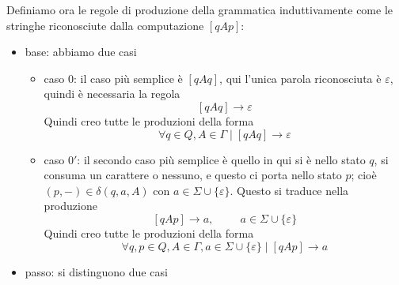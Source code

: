 \documentclass[12pt]{report}
\theoremstyle{definition}
\begin{document}
Definiamo ora le regole di produzione della grammatica induttivamente come le stringhe riconosciute dalla computazione $[qAp]$:
\begin{itemize}
	\item base: abbiamo due casi
		\begin{itemize}
			\item caso $0$: il caso più semplice è $[qAq]$, qui l'unica parola riconosciuta è $\varepsilon$, quindi è necessaria la regola
				$$ [qAq] \rightarrow \varepsilon $$
				Quindi creo tutte le produzioni della forma
				$$ \forall q \in Q, A \in \Gamma \mid [qAq] \rightarrow \varepsilon $$	%
			\item caso $0'$: il secondo caso più semplice è quello in qui si è nello stato $q$, si consuma un carattere o nessuno, e questo ci porta nello stato $p$; cioè $(p, -) \in \delta(q, a, A)$ con $a \in \Sigma \cup \{\varepsilon\}$.
				Questo si traduce nella produzione
				$$ [qAp] \rightarrow a, \hspace{1cm} a \in \Sigma \cup \{\varepsilon\} $$
				Quindi creo tutte le produzioni della forma
				$$ \forall q, p \in Q, A \in \Gamma, a \in \Sigma \cup \{\varepsilon\} \mid [qAp] \rightarrow a $$
		\end{itemize}
	\item passo: si distinguono due casi
		\begin{figure}[H]
			\centering
			\begin{subfigure}{0.45\textwidth}
				\centering
\end{subfigure}
\end{figure}
\end{itemize}
\end{document}
